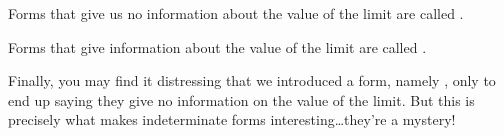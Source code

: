 \documentclass{ximera}
\begin{document}
\begin{definition}
Forms that give us no information about the value of the limit are
called .

Forms that give information about the value of the limit are called
.
\end{definition}  

Finally, you may find it distressing that we introduced a form, namely
\zeroOverZero, only to end up saying they give no information on the
value of the limit. But this is precisely what makes
indeterminate forms interesting\dots they're a mystery!
\end{document}
